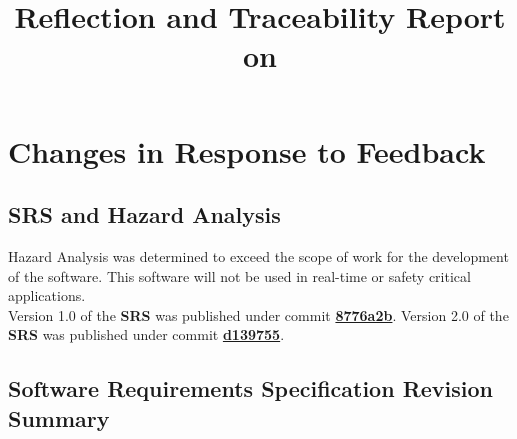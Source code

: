 \documentclass{article}
\title{Reflection and Traceability Report on \progname}
\author{\authname}
\date{}
\begin{document}
\maketitle

\section{Changes in Response to Feedback}

\subsection{SRS and Hazard Analysis}
Hazard Analysis was determined to exceed the scope of work for the development of the \progname{} software. This software will not be used in real-time or safety critical applications.\\ 

\noindent Version 1.0 of the \textbf{SRS} was published under commit \href{https://github.com/KiranSingh15/CAS-741-Image-Correspondences/commit/8776a2b2180b8d8d170e9e1b7e68392f4b424092#diff-135354e346cf609e826d36a28ad63746a7c537c4fcc1dec1663b35a4af2355f9}{\textbf{8776a2b}}. Version 2.0 of the \textbf{SRS} was published under commit \href{https://github.com/KiranSingh15/CAS-741-Image-Correspondences/commit/d139755d96b3c7b316cd7f96106ef69df3ab228a}{\textbf{d139755}}. 

\subsection*{Software Requirements Specification Revision Summary}
\end{document}
